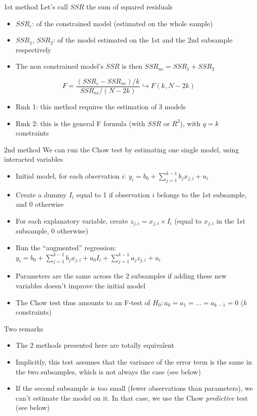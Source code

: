 \documentclass[aspectratio=169]{beamer}
\begin{document}
\begin{frame}{1st method}
Let's call $SSR$ the sum of squared residuals

\begin{itemize}
    \item $SSR_c$: of the constrained model (estimated on the whole sample)
    \item $SSR_1$, $SSR_2$: of the model estimated on the 1st and the 2nd subsample respectively
    \item The non constrained model's $SSR$ is then $SSR_{nc} = SSR_1 + SSR_2$
\end{itemize}

\[
F = \frac{(SSR_c - SSR_{nc})/k}{SSR_{nc}/(N-2k)} \hookrightarrow F(k, N-2k)
\]

\begin{itemize}
    \item Rmk 1: this method requires the estimation of 3 models
    \item Rmk 2: this is the general F formula (with $SSR$ or $R^2$), with $q = k$ constraints
\end{itemize}
\end{frame}

\begin{frame}{2nd method}
We can run the Chow test by estimating one single model, using interacted variables

\begin{itemize}
    \item Initial model, for each observation $i$: $y_i = b_0 + \sum_{j=1}^{k-1} b_j x_{j,i} + u_i$
    \item Create a dummy $I_i$ equal to 1 if observation $i$ belongs to the 1st subsample, and 0 otherwise
    \item For each explanatory variable, create $z_{j,i} = x_{j,i} \times I_i$ (equal to $x_{j,i}$ in the 1st subsample, 0 otherwise)
    \item Run the ``augmented'' regression: $y_i = b_0 + \sum_{j=1}^{k-1} b_j x_{j,i} + a_0 I_i + \sum_{j=1}^{k-1} a_j z_{j,i} + u_i$
    \item Parameters are the same across the 2 subsamples if adding these new variables doesn't improve the initial model
    \item The Chow test thus amounts to an F-test of $H_0: a_0 = a_1 = \dots = a_{k-1} = 0$ ($k$ constraints)
\end{itemize}
\end{frame}

\begin{frame}{Two remarks}
\begin{itemize}
    \item The 2 methods presented here are totally equivalent
    \item Implicitly, this test assumes that the variance of the error term is the same in the two subsamples, which is not always the case (see below)
    \item If the second subsample is too small (fewer observations than parameters), we can't estimate the model on it. In that case, we use the Chow \textit{predictive} test (see below)
\end{itemize}
\end{frame}
\end{document}
